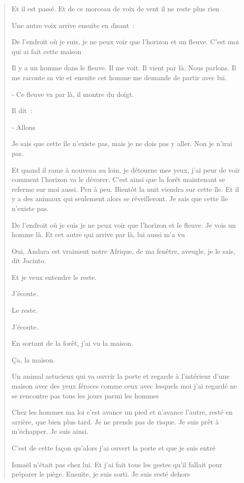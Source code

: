 \begin{quote}
Et il est passé. Et de ce morceau de voix de vent il ne reste plus rien

Une autre voix arrive ensuite en disant~:

De l'endroit où je suis, je ne peux voir que l'horizon et un fleuve.
C'est moi qui ai fait cette maison

Il y a un homme dans le fleuve. Il me voit. Il vient par là. Nous
parlons. Il me raconte sa vie et ensuite cet homme me demande de partir
avec lui.

- Ce fleuve va par là, il montre du doigt.

Il dit~:

- Allons

Je sais que cette île n'existe pas, mais je ne dois pas y aller. Non je
n'irai pas.

Et quand il rame à nouveau au loin, je détourne mes yeux, j'ai peur de
voir comment l'horizon va le dévorer. C'est ainsi que la forêt
maintenant se referme sur moi aussi. Peu à peu. Bientôt la nuit viendra
sur cette île. Et il y a des animaux qui seulement alors se
réveilleront. Je sais que cette île n'existe pas.

De l'endroit où je suis je ne peux voir que l'horizon et le fleuve. Je
vois un homme là. Et cet autre qui arrive par là, lui aussi m'a vu

Oui, Andara est vraiment notre Afrique, de ma fenêtre, aveugle, je le
sais, dit Jacinto.

Et je veux entendre le reste.

J'écoute.

Le reste.

J'écoute.

En sortant de la forêt, j'ai vu la maison.

Ça, la maison.

Un animal astucieux qui va ouvrir la porte et regarde à l'intérieur
d'une maison avec des yeux féroces comme ceux avec lesquels moi j'ai
regardé ne se rencontre pas tous les jours parmi les hommes

Chez les hommes ma loi c'est avance un pied et n'avance l'autre, resté
en arrière, que bien plus tard. Je ne prends pas de risque. Je suis prêt
à m'échapper. Je suis ainsi.

C'est de cette façon qu'alors j'ai ouvert la porte et que je suis entré

Ismaël n'était pas chez lui. Et j'ai fait tous les gestes qu'il fallait
pour préparer le piège. Ensuite, je suis sorti. Je suis resté dehors


\end{quote}
